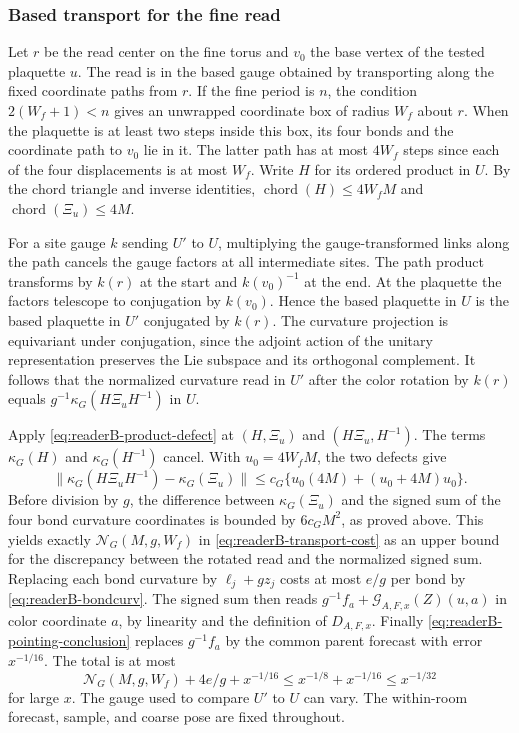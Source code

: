 \subsubsection{Based transport for the fine read}
\label{subsec:readerB-gauge-read}

Let $r$ be the read center on the fine torus and $v_0$ the base vertex
of the tested plaquette $u$. The read is in the based gauge obtained
by transporting along the fixed coordinate paths from $r$. If the fine
period is $n$, the condition $2(W_f+1)<n$ gives an unwrapped
coordinate box of radius $W_f$ about $r$. When the plaquette is at least
two steps inside this box, its four bonds and the coordinate path
to $v_0$ lie in it. The latter path has at most $4W_f$ steps since
each of the four displacements is at most $W_f$. Write $H$ for its
ordered product in $U$. By the chord triangle and inverse identities,
$\operatorname{chord}(H)\le 4W_fM$ and
$\operatorname{chord}(\Xi_u)\le4M$.

For a site gauge $k$ sending $U'$ to $U$, multiplying the gauge-transformed
links along the path cancels the gauge factors at all intermediate sites.
The path product transforms by $k(r)$ at the start and $k(v_0)^{-1}$ at
the end. At the plaquette the factors telescope to conjugation by
$k(v_0)$. Hence the based plaquette in $U$ is the based plaquette
in $U'$ conjugated by $k(r)$. The curvature projection is equivariant
under conjugation, since the adjoint action of the unitary representation
preserves the Lie subspace and its orthogonal complement. It follows that
the normalized curvature read in $U'$ after the color rotation by $k(r)$
equals $g^{-1}\kappa_G(H\Xi_uH^{-1})$ in $U$.

Apply \eqref{eq:readerB-product-defect} at $(H,\Xi_u)$ and
$(H\Xi_u,H^{-1})$. The terms $\kappa_G(H)$ and $\kappa_G(H^{-1})$
cancel. With $u_0=4W_fM$, the two defects give
\[
 \|\kappa_G(H\Xi_uH^{-1})-\kappa_G(\Xi_u)\|
 \le c_G\{u_0(4M)+(u_0+4M)u_0\}.
\]
Before division by $g$, the difference between $\kappa_G(\Xi_u)$
and the signed sum of the four bond curvature coordinates is bounded
by $6c_GM^2$, as proved above. This yields exactly
$\mathcal N_G(M,g,W_f)$ in \eqref{eq:readerB-transport-cost} as an upper bound
for the discrepancy between the rotated read and the normalized signed sum.
Replacing each bond curvature by $\ell_j+gz_j$ costs at most $e/g$
per bond by \eqref{eq:readerB-bondcurv}. The signed sum then reads
$g^{-1}f_a+\mathcal G_{A,F,x}(Z)(u,a)$ in color coordinate $a$, by linearity
and the definition of $D_{A,F,x}$. Finally
\eqref{eq:readerB-pointing-conclusion} replaces $g^{-1}f_a$ by the common
parent forecast with error $x^{-1/16}$. The total is at most
\[
 \mathcal N_G(M,g,W_f)+4e/g+x^{-1/16}
 \le x^{-1/8}+x^{-1/16}\le x^{-1/32}
\]
for large $x$. The gauge used to compare $U'$ to $U$ can vary. The
within-room forecast, sample, and coarse pose are fixed throughout.

